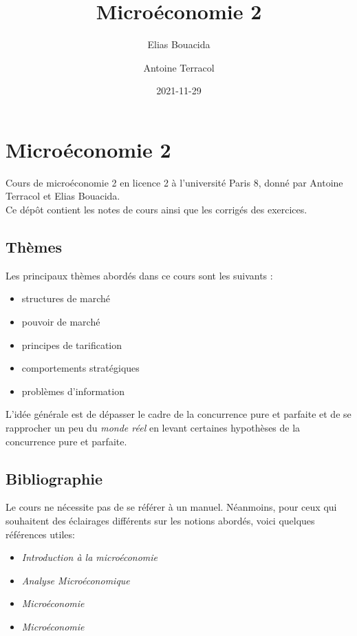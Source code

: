 \documentclass[
]{book}
\title{Microéconomie 2}
\author{Elias Bouacida \and Antoine Terracol}
\date{2021-11-29}
\providecommand{\tightlist}{%
  \setlength{\itemsep}{0pt}\setlength{\parskip}{0pt}}
\theoremstyle{definition}
\theoremstyle{definition}
\theoremstyle{definition}
\theoremstyle{definition}
\theoremstyle{remark}
\begin{document}
\maketitle

{
\setcounter{tocdepth}{1}
\tableofcontents
}
\hypertarget{microuxe9conomie-2}{%
\chapter{Microéconomie 2}\label{microuxe9conomie-2}}

Cours de microéconomie 2 en licence 2 à l'université Paris 8, donné par Antoine Terracol et Elias Bouacida.\\
Ce dépôt contient les notes de cours ainsi que les corrigés des exercices.

\hypertarget{thuxe8mes}{%
\section{Thèmes}\label{thuxe8mes}}

Les principaux thèmes abordés dans ce cours sont les suivants :

\begin{itemize}
\tightlist
\item
  structures de marché
\item
  pouvoir de marché
\item
  principes de tarification
\item
  comportements stratégiques
\item
  problèmes d'information
\end{itemize}

L'idée générale est de dépasser le cadre de la concurrence pure et parfaite et de se rapprocher un peu du \emph{monde réel} en levant certaines hypothèses de la concurrence pure et parfaite.

\hypertarget{bibliographie}{%
\section{Bibliographie}\label{bibliographie}}

Le cours ne nécessite pas de se référer à un manuel.
Néanmoins, pour ceux qui souhaitent des éclairages différents sur les notions abordés, voici quelques références utiles:

\begin{itemize}
\tightlist
\item
  \citet{varian2015} \emph{Introduction à la microéconomie}
\item
  \citet{varian2008} \emph{Analyse Microéconomique}
\item
  \citet{pindyck2012} \emph{Microéconomie}
\item
  \citet{jeleva2014} \emph{Microéconomie}
\end{itemize}
\end{document}
